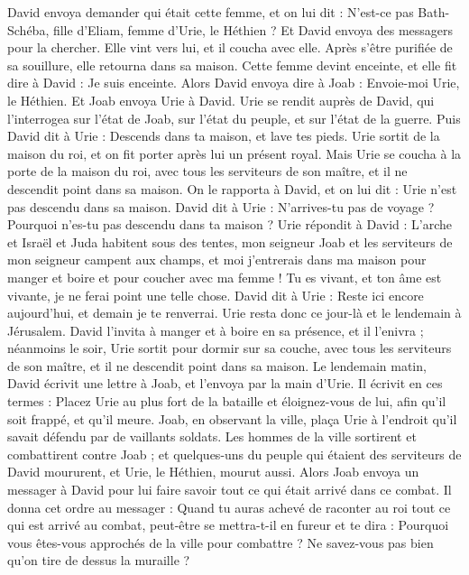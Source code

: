 \begin{multicols}{2}
David envoya demander qui était cette femme, et on lui dit : N'est-ce pas Bath-Schéba, fille d'Eliam, femme d'Urie, le Héthien ?
Et David envoya des messagers pour la chercher. Elle vint vers lui, et il coucha avec elle. Après s’être purifiée de sa souillure, elle retourna dans sa maison.
Cette femme devint enceinte, et elle fit dire à David : Je suis enceinte.
Alors David envoya dire à Joab : Envoie-moi Urie, le Héthien. Et Joab envoya Urie à David.
Urie se rendit auprès de David, qui l’interrogea sur l'état de Joab, sur l'état du peuple, et sur l'état de la guerre.
Puis David dit à Urie : Descends dans ta maison, et lave tes pieds. Urie sortit de la maison du roi, et on fit porter après lui un présent royal.
Mais Urie se coucha à la porte de la maison du roi, avec tous les serviteurs de son maître, et il ne descendit point dans sa maison.
On le rapporta à David, et on lui dit : Urie n'est pas descendu dans sa maison. David dit à Urie : N’arrives-tu pas de voyage ? Pourquoi n'es-tu pas descendu dans ta maison ?
Urie répondit à David : L'arche et Israël et Juda habitent sous des tentes, mon seigneur Joab et les serviteurs de mon seigneur campent aux champs, et moi j’entrerais dans ma maison pour manger et boire et pour coucher avec ma femme ! Tu es vivant, et ton âme est vivante, je ne ferai point une telle chose.
David dit à Urie : Reste ici encore aujourd'hui, et demain je te renverrai. Urie resta donc ce jour-là et le lendemain à Jérusalem.
David l'invita à manger et à boire en sa présence, et il l'enivra ; néanmoins le soir, Urie sortit pour dormir sur sa couche, avec tous les serviteurs de son maître, et il ne descendit point dans sa maison.
Le lendemain matin, David écrivit une lettre à Joab, et l’envoya par la main d'Urie.
Il écrivit en ces termes : Placez Urie au plus fort de la bataille et éloignez-vous de lui, afin qu'il soit frappé, et qu'il meure.
Joab, en observant la ville, plaça Urie à l’endroit qu'il savait défendu par de vaillants soldats.
Les hommes de la ville sortirent et combattirent contre Joab ; et quelques-uns du peuple qui étaient des serviteurs de David moururent, et Urie, le Héthien, mourut aussi.
Alors Joab envoya un messager à David pour lui faire savoir tout ce qui était arrivé dans ce combat.
Il donna cet ordre au messager : Quand tu auras achevé de raconter au roi tout ce qui est arrivé au combat, peut-être se mettra-t-il en fureur et te dira : Pourquoi vous êtes-vous approchés de la ville pour combattre ? Ne savez-vous pas bien qu'on tire de dessus la muraille ?

\end{multicols}
